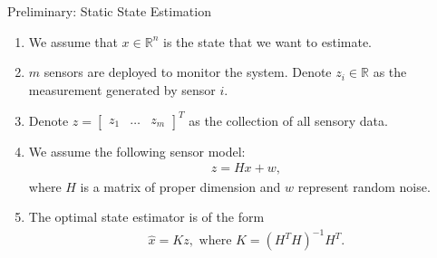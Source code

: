 \documentclass{beamer}
\begin{document}

  


\begin{frame}{Preliminary: Static State Estimation}
  \begin{enumerate}
  \item We assume that $x \in \mathbb R^n$ is the state that we want to estimate.
  \item $m$ sensors are deployed to monitor the system. Denote $z_i \in \mathbb R$ as the measurement generated by sensor $i$.
  \item Denote $z = \begin{bmatrix}z_1&\dots&z_m\end{bmatrix}^T$ as the collection of all sensory data.
  \item We assume the following sensor model:
    \begin{align*}
      z = Hx + w,
    \end{align*}
    where $H$ is a matrix of proper dimension and $w$ represent random noise.
  \item The optimal state estimator is of the form
    \begin{align*}
      \hat x = Kz, \text{ where }K = (H^TH)^{-1}H^T.
    \end{align*}
  \end{enumerate}
\end{frame}
\end{document}
